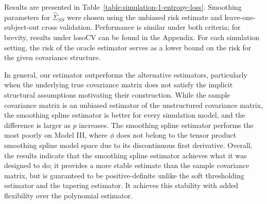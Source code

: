 \documentclass[12pt]{article}
\begin{document}
Results are presented in Table~\ref{table:simulation-1-entropy-loss}. Smoothing parameters for $\hat{\Sigma}_{SS}$ were chosen using the unbiased risk estimate \cite[Chapter ~3.22]{gu2013smoothing} and leave-one-subject-out cross validation. Performance is similar under both criteria; for brevity, results under losoCV can be found in the Appendix. For each simulation setting, the risk of the oracle estimator serves as a lower bound on the risk for the given covariance structure. 

In general, our estimator outperforms the alternative estimators, particularly when the underlying true covariance matrix does not satisfy the implicit structural assumptions motivating their construction. While the sample covariance matrix is an unbiased estimator of the unstructured covariance matrix,  the smoothing spline estimator is better for every simulation model, and the difference is larger as $p$ increases. The smoothing spline estimator performs the most poorly on Model III, where $\phi$ does not belong to the tensor product smoothing spline model space due to its discontinuous first derivative. Overall, the results indicate that the smoothing spline estimator achieves what it was designed to do; it provides a more stable estimate than the sample covariance matrix, but is guaranteed to be positive-definite unlike the soft thresholding estimator and the tapering estimator. It achieves this stability with added flexibility over the polynomial estimator. 
\end{document}
